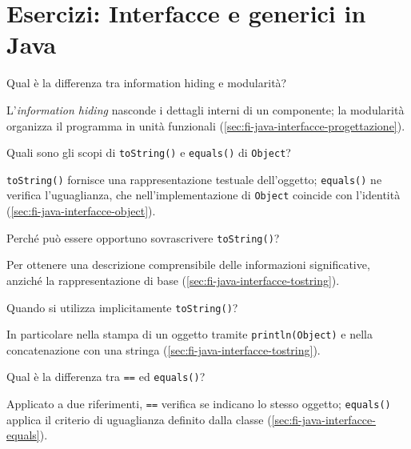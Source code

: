 \chapter{Esercizi: Interfacce e generici in Java}
\label{chap:esercizi-interfacce-generici-java}

\begin{exercise}
\label{ex:fi-esercizi-java-interfacce-design}
Qual è la differenza tra information hiding e modularità?
\end{exercise}

L'\emph{information hiding} nasconde i dettagli interni di un componente; la modularità organizza il programma in unità funzionali (\cref{sec:fi-java-interfacce-progettazione}).

\begin{exercise}
\label{ex:fi-esercizi-java-interfacce-object}
Quali sono gli scopi di \texttt{toString()} e \texttt{equals()} di \texttt{Object}?
\end{exercise}

\texttt{toString()} fornisce una rappresentazione testuale dell'oggetto; \texttt{equals()} ne verifica l'uguaglianza, che nell'implementazione di \texttt{Object} coincide con l'identità (\cref{sec:fi-java-interfacce-object}).

\begin{exercise}
\label{ex:fi-esercizi-java-interfacce-tostring}
Perché può essere opportuno sovrascrivere \texttt{toString()}?
\end{exercise}

Per ottenere una descrizione comprensibile delle informazioni significative, anziché la rappresentazione di base (\cref{sec:fi-java-interfacce-tostring}).

\begin{exercise}
\label{ex:fi-esercizi-java-interfacce-stampa}
Quando si utilizza implicitamente \texttt{toString()}?
\end{exercise}

In particolare nella stampa di un oggetto tramite \texttt{println(Object)} e nella concatenazione con una stringa (\cref{sec:fi-java-interfacce-tostring}).

\begin{exercise}
\label{ex:fi-esercizi-java-interfacce-equals}
Qual è la differenza tra \texttt{==} ed \texttt{equals()}?
\end{exercise}

Applicato a due riferimenti, \texttt{==} verifica se indicano lo stesso oggetto; \texttt{equals()} applica il criterio di uguaglianza definito dalla classe (\cref{sec:fi-java-interfacce-equals}).

